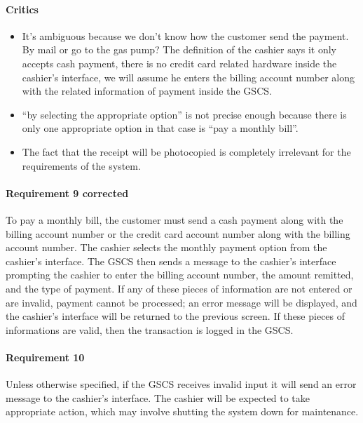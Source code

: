 \begin{framed}
    \paragraph{Critics}
    \begin{itemize}
        \item It's ambiguous because we don't know how the customer send
            the payment. By mail or go to the gas pump? The definition of the
            cashier says it only accepts cash payment, there is no credit card
            related hardware inside the cashier's interface, we will assume he
            enters the billing account number along with the related information
            of payment inside the GSCS.\@

        \item \enquote{by selecting the appropriate option} is not precise
            enough because there is only one appropriate option in that case is
            \enquote{pay a monthly bill}.

        \item The fact that the receipt will be photocopied is
            completely irrelevant for the requirements of the system.
    \end{itemize}

    \paragraph{Requirement 9 corrected} To pay a monthly bill, the customer must send
    a cash payment along with the billing account number or the credit card account
    number along with the billing account number. The cashier selects
    the monthly payment option from the
    cashier's interface. The GSCS then sends a message to the cashier's interface
    prompting the cashier to enter the billing account number, the amount
    remitted, and the type of payment. If any of these pieces of information
    are not entered or are invalid, payment cannot be processed; an error
    message will be displayed, and the cashier's interface will be returned
    to the previous screen. If these pieces of informations are valid, then the
    transaction is logged in the GSCS.\@
\end{framed}

\paragraph{Requirement 10} Unless otherwise specified, if the GSCS receives
invalid input it will send an error message to the cashier's interface.
The cashier will be expected to take appropriate action, which may
involve shutting the system down for maintenance.

